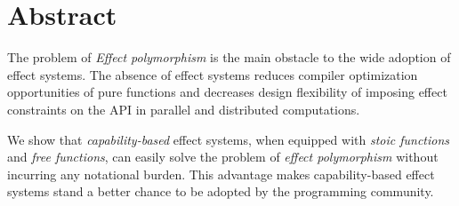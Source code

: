 \section*{\centering Abstract}

The problem of \emph{Effect polymorphism} is the main obstacle to the
wide adoption of effect systems. The absence of effect systems reduces
compiler optimization opportunities of pure functions and decreases
design flexibility of imposing effect constraints on the API in
parallel and distributed computations.


We show that \emph{capability-based} effect systems, when equipped
with \emph{stoic functions} and \emph{free functions}, can easily
solve the problem of \emph{effect polymorphism} without incurring any
notational burden. This advantage makes capability-based effect
systems stand a better chance to be adopted by the programming
community.

